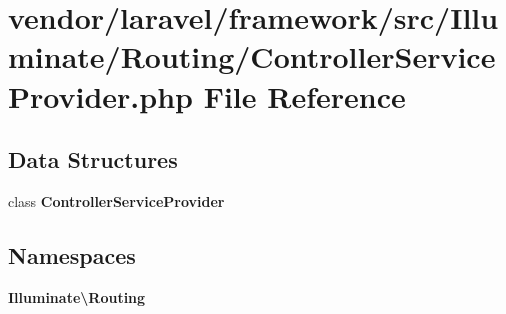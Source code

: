 \section{vendor/laravel/framework/src/\+Illuminate/\+Routing/\+Controller\+Service\+Provider.php File Reference}
\label{_controller_service_provider_8php}
\subsection*{Data Structures}
\begin{DoxyCompactItemize}
\item 
class {\bf Controller\+Service\+Provider}
\end{DoxyCompactItemize}
\subsection*{Namespaces}
\begin{DoxyCompactItemize}
\item 
 {\bf Illuminate\textbackslash{}\+Routing}
\end{DoxyCompactItemize}
